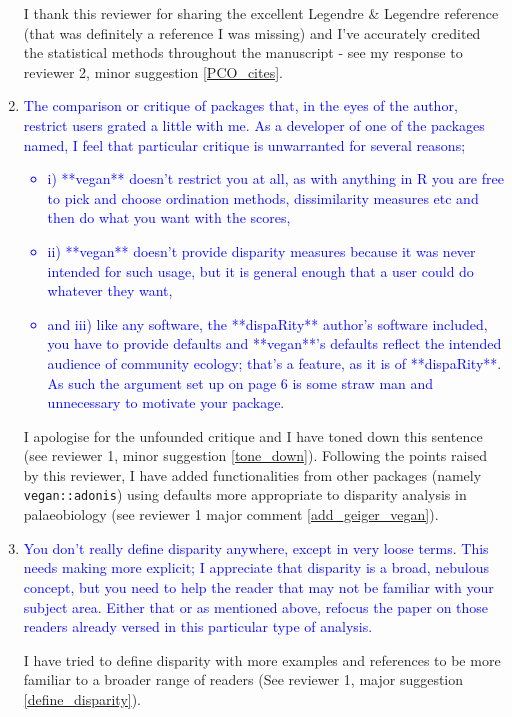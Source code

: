 \documentclass[12pt,letterpaper]{article}
\begin{document}
\begin{enumerate}
I thank this reviewer for sharing the excellent Legendre \& Legendre reference (that was definitely a reference I was missing) and I've accurately credited the statistical methods throughout the manuscript - see my response to reviewer 2, minor suggestion \ref{PCO_cites}.





\item{\textcolor{blue}{The comparison or critique of packages that, in the eyes of the author, restrict users grated a little with me. As a developer of one of the packages named, I feel that particular critique is unwarranted for several reasons;
\begin{itemize}
\item i) **vegan** doesn't restrict you at all, as with anything in R you are free to pick and choose ordination methods, dissimilarity measures etc and then do what you want with the scores,
\item ii) **vegan** doesn't provide disparity measures because it was never intended for such usage, but it is general enough that a user could do whatever they want,
\item and iii) like any software, the **dispaRity** author's software included, you have to provide defaults and **vegan**'s defaults reflect the intended audience of community ecology; that's a feature, as it is of **dispaRity**. As such the argument set up on page 6 is some straw man and unnecessary to motivate your package.
\end{itemize}
}}

I apologise for the unfounded critique and I have toned down this sentence (see reviewer 1, minor suggestion \ref{tone_down}).
Following the points raised by this reviewer, I have added functionalities from other packages (namely \texttt{vegan::adonis}) using defaults more appropriate to disparity analysis in palaeobiology (see reviewer 1 major comment \ref{add_geiger_vegan}).

\item{\textcolor{blue}{You don't really define disparity anywhere, except in very loose terms.
This needs making more explicit; I appreciate that disparity is a broad, nebulous concept, but you need to help the reader that may not be familiar with your subject area.
Either that or as mentioned above, refocus the paper on those readers already versed in this particular type of analysis.}}
\label{nebulous}

I have tried to define disparity with more examples and references to be more familiar to a broader range of readers (See reviewer 1, major suggestion \ref{define_disparity}).



\end{enumerate}
\end{document}
